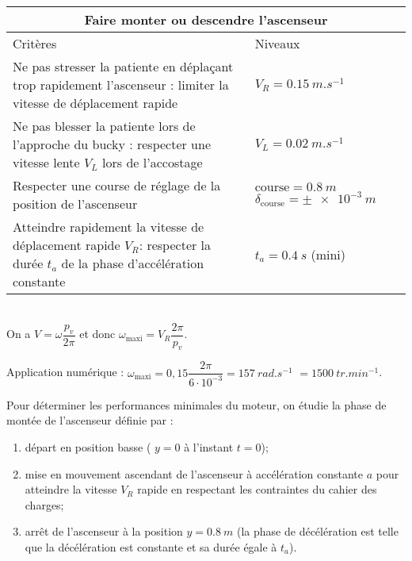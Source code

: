 \ifprof
\else
\begin{center}
\begin{tabular}{p{.6\linewidth}p{.3\linewidth}}

\multicolumn{2}{c}{Faire monter ou descendre l'ascenseur} \\
\hline
Critères & Niveaux \\
\hline
Ne pas stresser la patiente en déplaçant trop rapidement l’ascenseur : limiter la vitesse de
déplacement rapide & $V_R=\SI{0,15}{m.s^{-1}}$ \\ 
Ne pas blesser la patiente lors de l’approche du bucky : respecter une vitesse lente $V_L$ lors de
l’accostage & $V_L=\SI{0,02}{m.s^{-1}}$ \\ 
Respecter une course de réglage de la position de l’ascenseur & $\text{course} = \SI{0,8}{m}$  $\delta_{\text{course}}=\pm\SI{e-3}{m}$ \\ 
Atteindre rapidement la vitesse de déplacement rapide $V_R$: respecter
la durée $t_a$ de la phase d’accélération constante & $t_a=\SI{0,4}{s}$ (mini)
 \\ \hline
\end{tabular}
\end{center}


\fi

\ifprof
\begin{corrige}~\\
On a $V=\omega \dfrac{p_v}{2\pi}$ et donc $\omega_{\text{maxi}} = V_R\dfrac{2\pi}{p_v}$.

Application numérique : $\omega_{\text{maxi}} = 0,15\dfrac{2\pi}{6\cdot 10^{-3}}=\SI{157}{rad.s^{-1}}$ $=\SI{1500}{tr.min^{-1}}$.
\end{corrige}
\else
\fi

\ifprof
\else
Pour déterminer les performances minimales du moteur, on étudie la phase de montée de l’ascenseur définie par :
\begin{enumerate}
\item départ en position basse ( $y=0$ à l’instant $t=0$);
\item mise en mouvement ascendant de l’ascenseur à accélération constante $a$ pour atteindre la vitesse $V_R$ rapide en respectant les contraintes du cahier des charges;
\item arrêt de l’ascenseur à la position $y=\SI{0,8}{m}$ (la phase de décélération est telle que la décélération est constante et sa durée égale à $t_a$).
\end{enumerate}
\fi


